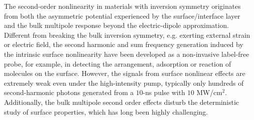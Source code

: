 \documentclass[a4paper,8pt,hyperref, twocolumn]{article}
\begin{document}
The second-order nonlinearity in materials with inversion symmetry originates from both the asymmetric potential experienced by the surface/interface layer and the bulk multipole response beyond the electric-dipole approximation. 
Different from breaking the bulk inversion symmetry, e.g. exerting external strain or electric field, the second harmonic and sum frequency generation induced by the intrinsic surface nonlinearity have been developed as a non-invasive label-free probe, for example, in detecting the arrangement,  adsorption or reaction of molecules on the surface.  %
However, the signals from surface nonlinear effects are extremely weak even under the high-intensity pump, typically only hundreds of second-harmonic photons generated from a $10$-ns pulse with $10$ MW/cm$^{2}$. 
Additionally, the bulk multipole second order effects disturb the deterministic study of surface properties, which has long been highly challenging.
\end{document}
